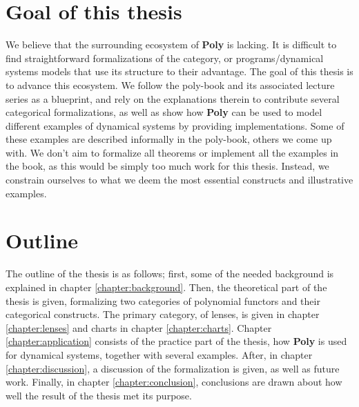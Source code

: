 \section{Goal of this thesis}
We believe that the surrounding ecosystem of \textbf{Poly} is lacking. It is difficult to find straightforward formalizations of the category, or programs/dynamical systems models that use its structure to their advantage. The goal of this thesis is to advance this ecosystem. We follow the poly-book and its associated lecture series as a blueprint, and rely on the explanations therein to contribute several categorical formalizations, as well as show how \textbf{Poly} can be used to model different examples of dynamical systems by providing implementations. Some of these examples are described informally in the poly-book, others we come up with. We don't aim to formalize all theorems or implement all the examples in the book, as this would be simply too much work for this thesis. Instead, we constrain ourselves to what we deem the most essential constructs and illustrative examples.





\section{Outline}
The outline of the thesis is as follows; first, some of the needed background is explained in chapter \ref{chapter:background}. Then, the theoretical part of the thesis is given, formalizing two categories of polynomial functors and their categorical constructs. The primary category, of lenses, is given in chapter \ref{chapter:lenses} and charts in chapter \ref{chapter:charts}. Chapter \ref{chapter:application} consists of the practice part of the thesis, how \textbf{Poly} is used for dynamical systems, together with several examples. After, in chapter \ref{chapter:discussion}, a discussion of the formalization is given, as well as future work. Finally, in chapter \ref{chapter:conclusion}, conclusions are drawn about how well the result of the thesis met its purpose.

